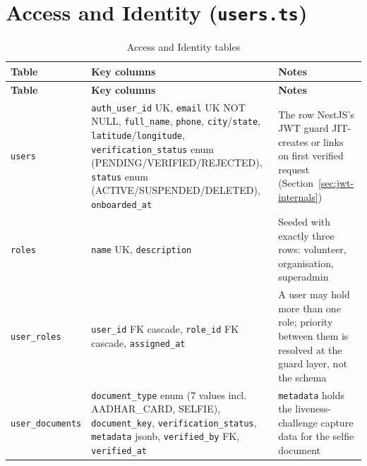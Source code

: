\begingroup
\footnotesize

\section{Access and Identity (\texttt{users.ts})}
\begin{longtable}{|>{\raggedright\arraybackslash}p{}|>{\raggedright\arraybackslash}p{}|>{\raggedright\arraybackslash}p{}|}
\caption{Access and Identity tables}\\\hline
\textbf{Table} & \textbf{Key columns} & \textbf{Notes}\\\hline
\endfirsthead\hline\textbf{Table} & \textbf{Key columns} & \textbf{Notes}\\\hline\endhead
\texttt{users} & \texttt{auth\_user\_id} UK, \texttt{email} UK NOT NULL, \texttt{full\_name}, \texttt{phone}, \texttt{city}/\allowbreak\texttt{state}, \texttt{latitude}/\allowbreak\texttt{longitude}, \texttt{verification\_status} enum (PENDING/\allowbreak VERIFIED/\allowbreak REJECTED), \texttt{status} enum (ACTIVE/\allowbreak SUSPENDED/\allowbreak DELETED), \texttt{onboarded\_at} & The row NestJS's JWT guard JIT-creates or links on first verified request (Section~\ref{sec:jwt-internals})\\\hline
\texttt{roles} & \texttt{name} UK, \texttt{description} & Seeded with exactly three rows: volunteer, organisation, superadmin\\\hline
\texttt{user\_roles} & \texttt{user\_id} FK cascade, \texttt{role\_id} FK cascade, \texttt{assigned\_at} & A user may hold more than one role; priority between them is resolved at the guard layer, not the schema\\\hline
\texttt{user\_\allowbreak documents} & \texttt{document\_type} enum (7 values incl. AADHAR\_CARD, SELFIE), \texttt{document\_key}, \texttt{verification\_status}, \texttt{metadata} jsonb, \texttt{verified\_by} FK, \texttt{verified\_at} & \texttt{metadata} holds the liveness-challenge capture data for the selfie document\\\hline
\end{longtable}

